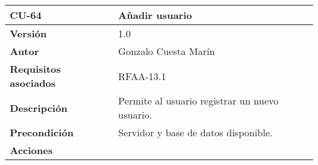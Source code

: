 \begin{longtable}[]{@{}ll@{}}
\toprule
\begin{minipage}[b]{0.20\columnwidth}\raggedright
\textbf{CU-64}\strut
\end{minipage} & \begin{minipage}[b]{0.74\columnwidth}\raggedright
\textbf{Añadir usuario}\strut
\end{minipage}\tabularnewline
\midrule
\endhead
\begin{minipage}[t]{0.20\columnwidth}\raggedright
\textbf{Versión}\strut
\end{minipage} & \begin{minipage}[t]{0.74\columnwidth}\raggedright
1.0\strut
\end{minipage}\tabularnewline
\begin{minipage}[t]{0.20\columnwidth}\raggedright
\textbf{Autor}\strut
\end{minipage} & \begin{minipage}[t]{0.74\columnwidth}\raggedright
Gonzalo Cuesta Marín\strut
\end{minipage}\tabularnewline
\begin{minipage}[t]{0.20\columnwidth}\raggedright
\textbf{Requisitos asociados}\strut
\end{minipage} & \begin{minipage}[t]{0.74\columnwidth}\raggedright
RFAA-13.1\strut
\end{minipage}\tabularnewline
\begin{minipage}[t]{0.20\columnwidth}\raggedright
\textbf{Descripción}\strut
\end{minipage} & \begin{minipage}[t]{0.74\columnwidth}\raggedright
Permite al usuario registrar un nuevo usuario.\strut
\end{minipage}\tabularnewline
\begin{minipage}[t]{0.20\columnwidth}\raggedright
\textbf{Precondición}\strut
\end{minipage} & \begin{minipage}[t]{0.74\columnwidth}\raggedright
Servidor y base de datos disponible.\strut
\end{minipage}\tabularnewline
\begin{minipage}[t]{0.20\columnwidth}\raggedright
\textbf{Acciones}\strut
\end{minipage} & \begin{minipage}[t]{0.74\columnwidth}\raggedright
\begin{enumerate}
\def\labelenumi{\arabic{enumi}.}

\end{enumerate}
\end{minipage}
\end{longtable}
